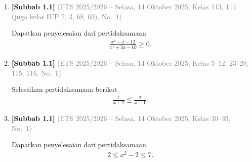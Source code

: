 \documentclass[10pt,openany,a4paper]{article}
\theoremstyle{definition}
\theoremstyle{definition}
\theoremstyle{plain}
\begin{document}
\begin{enumerate}
    \item \textbf{[Subbab 1.1]} {\footnotesize\textcolor{gray}{(ETS 2025/2026 -- Selasa, 14 Oktober 2025, Kelas 113, 114 (juga kelas IUP 2, 3, 68, 69), No.~1)}}\par
    Dapatkan penyelesaian dari pertidaksamaan
    \begin{align*}
        \frac{x^2-x-12}{x^2+3x-10}\geq 0.
    \end{align*}

    \item \textbf{[Subbab 1.1]} {\footnotesize\textcolor{gray}{(ETS 2025/2026 -- Selasa, 14 Oktober 2025, Kelas 5--12, 23--29, 115, 116, No.~1)}}\par
    Selesaikan pertidaksamaan berikut
    \begin{align*}
        \frac{1}{x+2} \leq \frac{2}{x-1}.
    \end{align*}

    \item \textbf{[Subbab 1.1]} {\footnotesize\textcolor{gray}{(ETS 2025/2026 -- Selasa, 14 Oktober 2025, Kelas 30--39, No.~1)}}\par
    Dapatkan penyelesaian dari pertidaksamaan
    \begin{align*}
        2\leq x^2-2\leq 7.
    \end{align*}

\end{enumerate}
\end{document}
